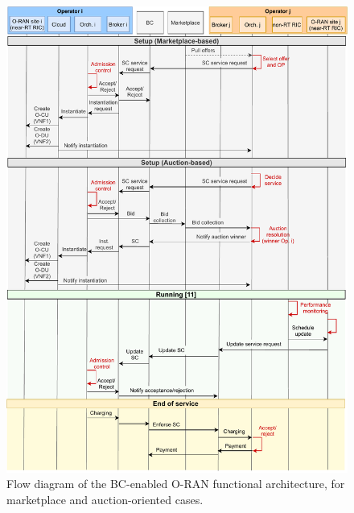 \documentclass[journal]{IEEEtran}
\begin{document}
\begin{figure}[ht!]
\centering
\includegraphics[width=1\columnwidth]{flowdiagram_complete.pdf}
\caption{Flow diagram of the BC-enabled O-RAN functional architecture, for marketplace and auction-oriented cases.}
\label{fig:functionalarchitectureflowdiagram}
\end{figure}

\end{document}
